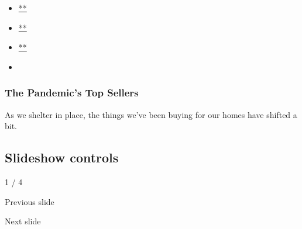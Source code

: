 \begin{itemize}
\item
  \href{https://www.facebookcorewwwi.onion/sharer.php?app_id=9869919170\&u=https\%3A\%2F\%2Fwww.nytimes3xbfgragh.onion\%2Fslideshow\%2F2020\%2F07\%2F31\%2Frealestate\%2Fthe-pandemics-top-sellers.html\%3Fsmid\%3Dfb-share\&name=The\%20Pandemic\%E2\%80\%99s\%20Top\%20Sellers\&redirect_uri=https\%3A\%2F\%2Fwww.facebookcorewwwi.onion\%2F}{**}
\item
  \href{https://twitter.com/intent/tweet?url=https\%3A\%2F\%2Fwww.nytimes3xbfgragh.onion\%2Fslideshow\%2F2020\%2F07\%2F31\%2Frealestate\%2Fthe-pandemics-top-sellers.html\%3Fsmid\%3Dtw-share\&text=The\%20Pandemic\%E2\%80\%99s\%20Top\%20Sellers}{**}
\item
  \href{mailto:?subject=nytimes3xbfgragh.onion\%3A\%20The\%20Pandemic\%E2\%80\%99s\%20Top\%20Sellers\&body=From\%20The\%20New\%20York\%20Times\%3A\%0A\%0AThe\%20Pandemic\%E2\%80\%99s\%20Top\%20Sellers\%0A\%0AAs\%20we\%20shelter\%20in\%20place\%2C\%20the\%20things\%20we\%E2\%80\%99ve\%20been\%20buying\%20for\%20our\%20homes\%20have\%20shifted\%20a\%20bit.\%0A\%0Ahttps\%3A\%2F\%2Fwww.nytimes3xbfgragh.onion\%2Fslideshow\%2F2020\%2F07\%2F31\%2Frealestate\%2Fthe-pandemics-top-sellers.html\%3Fsmid\%3Dem-share}{**}
\item
\end{itemize}

\hypertarget{the-pandemics-top-sellers-1}{%
\subsubsection{The Pandemic's Top
Sellers}\label{the-pandemics-top-sellers-1}}

As we shelter in place, the things we've been buying for our homes have
shifted a bit.

\hypertarget{slideshow-controls}{%
\subsection{Slideshow controls}\label{slideshow-controls}}

1 / 4

Previous slide

Next slide
